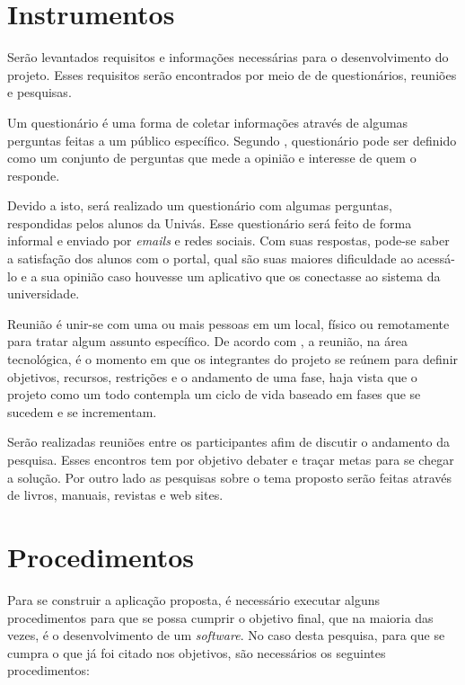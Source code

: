 \section{Instrumentos}

	\par Serão levantados requisitos e informações necessárias para o
desenvolvimento do projeto. Esses requisitos serão encontrados por meio de
de questionários, reuniões e pesquisas.

	\par Um questionário é uma forma de coletar informações através de algumas
perguntas feitas a um público específico. Segundo ,
questionário pode ser definido como um conjunto de perguntas que mede a opinião
e interesse de quem o responde.

	\par Devido a isto, será realizado um questionário com algumas perguntas,
respondidas pelos alunos da Univás. Esse questionário será feito de forma
informal e enviado por \textit{emails} e redes sociais. Com suas respostas,
pode-se saber a satisfação dos alunos com o portal, qual são suas maiores
dificuldade ao acessá-lo e a sua opinião caso houvesse um aplicativo que os
conectasse ao sistema da universidade.

	\par Reunião é unir-se com uma ou mais pessoas em um local, físico ou
remotamente para tratar algum assunto específico. De acordo com
, a reunião, na área tecnológica, é o momento em que
os integrantes do projeto se reúnem para definir objetivos, recursos, restrições
e o andamento de uma fase, haja vista que o projeto como um todo contempla um
ciclo de vida baseado em fases que se sucedem e se incrementam.
	\par Serão realizadas reuniões entre os participantes afim de discutir o
andamento da pesquisa. Esses encontros tem por objetivo debater e traçar metas
para se chegar a solução. Por outro lado as pesquisas sobre o tema proposto
serão feitas através de livros, manuais, revistas e web sites.
	
\section{Procedimentos}

	\par Para se construir a aplicação proposta, é necessário executar alguns 
procedimentos para que se possa cumprir o objetivo final, que na maioria das
vezes, é o desenvolvimento de um \textit{software}. No caso desta pesquisa,
para que se cumpra o que já foi citado nos objetivos, são necessários os
seguintes procedimentos:

